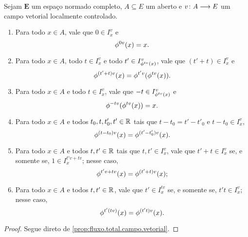 \begin{proposition}
\label{prop:fluxo.campo.vetorial}
Sejam $\bm E$ um espaço normado completo, $A \subseteq E$ um aberto e $v\colon \allowbreak A \longrightarrow E$ um campo vetorial localmente controlado.
	\begin{enumerate}
	\item Para todo $x \in A$, vale que $0 \in I^v_x$ e
		\begin{equation*}
		\phi^{0v}(x) = x.
		\end{equation*}
	\item Para todo $x \in A$, todo $t \in I^v_x$ e todo $t' \in I^v_{\phi^{tv}(x)}$, vale que $(t'+t) \in I^v_x$ e
		\begin{equation*}
		\phi^{(t'+t)v}(x) = \phi^{t'v} (\phi^{tv}(x)).
		\end{equation*}
	\item Para todo $x \in A$ e todo $t \in I^v_x$, vale que $-t \in I^v_{\phi^{tv}(x)}$ e
		\begin{equation*}
		\phi^{-tv}(\phi^{tv}(x)) = x.
		\end{equation*}
	\item Para todo $x \in A$ e todos $t_0, t, t'_0, t' \in \mathbb{R}$ tais que $t-t_0 = t'-t'_0$ e $t-t_0 \in I^v_x$,
		\begin{equation*}
		\phi^{(t - t_0)v}(x) = \phi^{(t' - t'_0)v}(x).
		\end{equation*}
	\item Para todo $x \in A$ e todos $t, t' \in \mathbb{R}$ tais que $t, t' \in I^v_x$, vale que $t' + t \in I^v_x$ se, e somente se, $1 \in I^{t'v + tv}_x$; nesse caso,
		\begin{equation*}
		\phi^{t'v + tv}(x) = \phi^{(t' + t)v}(x);
		\end{equation*}
	\item Para todo $x \in A$ e todos $t, t' \in \mathbb{R}$, vale que $t' \in I^{tv}_x$ se, e somente se, $t't \in I^{v}_x$; nesse caso,
		\begin{equation*}
		\phi^{t'(tv)}(x) = \phi^{(t't)v}(x).
		\end{equation*}
	\end{enumerate}
\end{proposition}
\begin{proof}
Segue direto de \ref{prop:fluxo.total.campo.vetorial}.
\end{proof}

